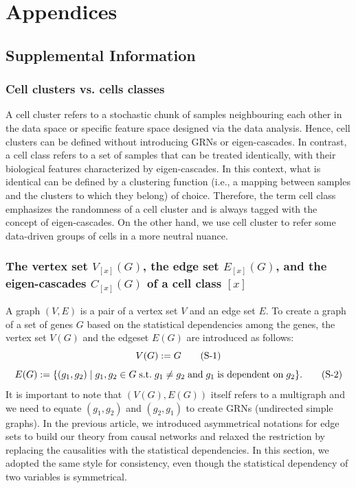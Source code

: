 \documentclass{article}
\title{\empty}
\author{\empty}
\date{\empty}
\begin{document}
\maketitle

\section*{Appendices}
\subsection*{Supplemental Information}
\subsubsection*{Cell clusters vs. cells classes}
A cell cluster refers to a stochastic chunk of samples neighbouring each other in the data space or specific feature 
space designed via the data analysis. Hence, cell clusters can be defined without introducing GRNs or eigen-cascades. 
In contrast, a cell class refers to a set of samples that can be treated identically, with their biological 
features characterized by eigen-cascades. In this context, what is identical can be defined by a clustering function 
(i.e., a mapping between samples and the clusters to which they belong) of choice. Therefore, the term cell class 
emphasizes the randomness of a cell cluster and is always tagged with the concept of eigen-cascades. On the other 
hand, we use cell cluster to refer some data-driven groups of cells in a more neutral nuance.

\subsubsection*{
  The vertex set $V_{[x]}(G)$, the edge set $E_{[x]}(G)$, and the eigen-cascades $C_{[x]}(G)$ of a cell class $[x]$
}
A graph $(V, E)$ is a pair of a vertex set $V$ and an edge set $E$. To create a graph of a set of genes $G$ based on the 
statistical dependencies among the genes, the vertex set $V(G)$ and the edgeset $E(G)$ are introduced as follows:
\begin{equation}\label{V}
  V(G):=G \stepcounter{equation} \tag{S-\theequation}
\end{equation}
\begin{equation}\label{E}
  E(G):=\{(g_1, g_2)\;|\;g_1,g_2\in G\;\text{s.t.}\;g_1\neq g_2\;\text{and}\; g_1\;\text{is dependent on}\;g_2\}.
  \stepcounter{equation} \tag{S-\theequation}
\end{equation}
It is important to note that $(V(G),E(G))$ itself refers to a multigraph and we need to equate $(g_1,g_2)$ and $(g_2,g_1)$ to 
create GRNs (undirected simple graphs). In the previous article, we introduced asymmetrical notations for edge sets 
to build our theory from causal networks and relaxed the restriction by replacing the causalities with the statistical 
dependencies. In this section, we adopted the same style for consistency, even though the statistical dependency of 
two variables is symmetrical.
\end{document}

